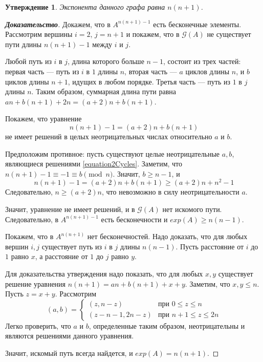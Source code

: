 \documentclass[12pt]{article}
\newtheorem{proposition}[theorem]{Утверждение}
\begin{document}
\begin{proposition}
Экспонента данного графа равна $n(n+1)$.
\end{proposition}
\begin{proof}[\textbf{Доказательство}]
Докажем, что в $A^{n(n + 1) - 1}$ есть бесконечные элементы. Рассмотрим вершины $i = 2$, $j = n + 1$ и покажем, что в $\mathcal{G}(A)$ не существует пути длины $n(n + 1) - 1$ между $i$ и $j$.

Любой путь из $i$ в $j$, длина которого больше $n - 1$, состоит из трех частей: первая часть --- путь из $i$ в $1$ длины $n$, вторая часть --- $a$ циклов длины $n$, и $b$ циклов длины $n + 1$, идущих в любом порядке. Третья часть --- путь из $1$ в $j$ длины $n$. Таким образом, суммарная длина пути равна $an + b(n + 1) + 2n = (a+2)n + b(n + 1)$.

Покажем, что уравнение \begin{equation}
\label{equation2Cycles}
n(n+1)-1 = (a+2)n + b(n + 1)
\end{equation}
не имеет решений в целых неотрицательных числах относительно $a$ и $b$.

Предположим противное: пусть существуют целые неотрицательные $a, b$, являющиеся решениями \ref{equation2Cycles}. Заметим, что $n(n+1)-1 \equiv -1 \equiv b \pmod{n}$. Значит, $b \ge n - 1$, и\begin{equation*}
n(n+1)-1 = (a+2)n + b(n + 1) \ge (a+2)n + n^2 - 1
\end{equation*}
Следовательно, $n \ge (a + 2)n$, что невозможно в силу неотрицательности $a$.

Значит, уравнение не имеет решений, и в $\mathcal{G}(A)$ нет искомого пути. Следовательно, в $A^{n(n + 1) - 1}$ есть бесконечности и $exp(A) \ge n(n-1)$.

Покажем, что в $A^{n(n + 1)}$ нет бесконечностей. Надо доказать, что для любых вершин $i, j$ существует путь из $i$ в $j$ длины $n(n - 1)$. Пусть расстояние от $i$ до $1$ равно $x$, а расстояние от $1$ до $j$ равно $y$.

Для доказательства утверждения надо показать, что для любых $x, y$ существует решение уравнения $n(n+1) = an + b(n + 1) + x + y$. Заметим, что $x, y \le n$. Пусть $z = x + y$. Рассмотрим \begin{equation*}
(a, b) = \begin{cases}
(z, n - z) & \text{при $0 \le z \le n$} \\
(z - n - 1, 2n - z) & \text{при $n+1 \le z \le 2n$}
\end{cases}
\end{equation*}
Легко проверить, что $a$ и $b$, определенные таким образом, неотрицательны и являются решениями данного уравнения.

Значит, искомый путь всегда найдется, и $exp(A) = n(n + 1)$.
\end{proof}
\end{document}
